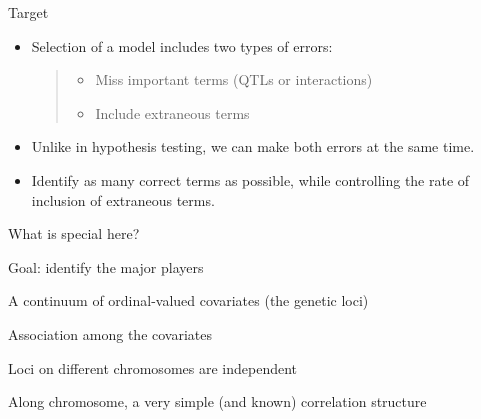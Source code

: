 \documentclass[aspectratio=169,12pt,t]{beamer}
\begin{document}
\begin{frame}{Target}


\hfill \begin{minipage}{10in}
\begin{itemize}
\itemsep24pt
\item Selection of a model includes two types of errors:


\begin{quote} \begin{itemize}
\item Miss important terms (QTLs or interactions)
\item Include extraneous terms
\end{itemize} \end{quote}

\item Unlike in hypothesis testing, we can make {\hilit both errors} at
the same time.

\item {\color{myyellow} Identify as many correct terms as possible, while
{\hilit controlling the rate of inclusion of extraneous terms}.}

\end{itemize}
\end{minipage}

\end{frame}









\begin{frame}{What is special here?}


\bbi

\item Goal: identify the major players

\item A continuum of ordinal-valued covariates (the genetic loci)

\item Association among the covariates

\bi
\item Loci on different chromosomes are independent
\item Along chromosome, a very simple (and known) correlation
  structure
\ei

\ei

\end{frame}
\end{document}

